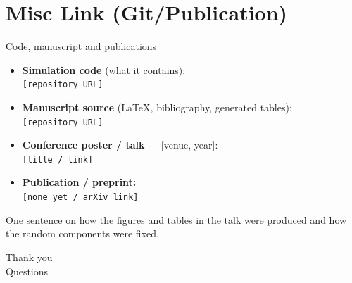 \documentclass[aspectratio=43, 11pt, xcolor=dvipsnames, compress]{beamer}
\newif\ifhasbib
\begin{document}
\section{Misc Link (Git/Publication)}
\begin{frame}{Code, manuscript and publications}
  \begin{itemize}
    \item \textbf{Simulation code} (what it contains):\\
      \texttt{[repository URL]}
    \item \textbf{Manuscript source} (LaTeX, bibliography, generated tables):\\
      \texttt{[repository URL]}
    \item \textbf{Conference poster / talk} --- [venue, year]:\\
      \texttt{[title / link]}
    \item \textbf{Publication / preprint:}\\
      \texttt{[none yet / arXiv link]}
  \end{itemize}
  \vskip0.4cm
  \small One sentence on how the figures and tables in the talk were produced and how the random components were fixed.
\end{frame}

\ifhasbib   %
\section*{References}
\begin{frame}[allowframebreaks]{References}
  \printbibliography[heading=none]
\end{frame}
\fi

\begin{frame}[plain]
  \begin{center}
    \vfill
    {\Huge Thank you}\\[0.5cm]
    {\large Questions}
    \vfill
  \end{center}
\end{frame}
\end{document}
